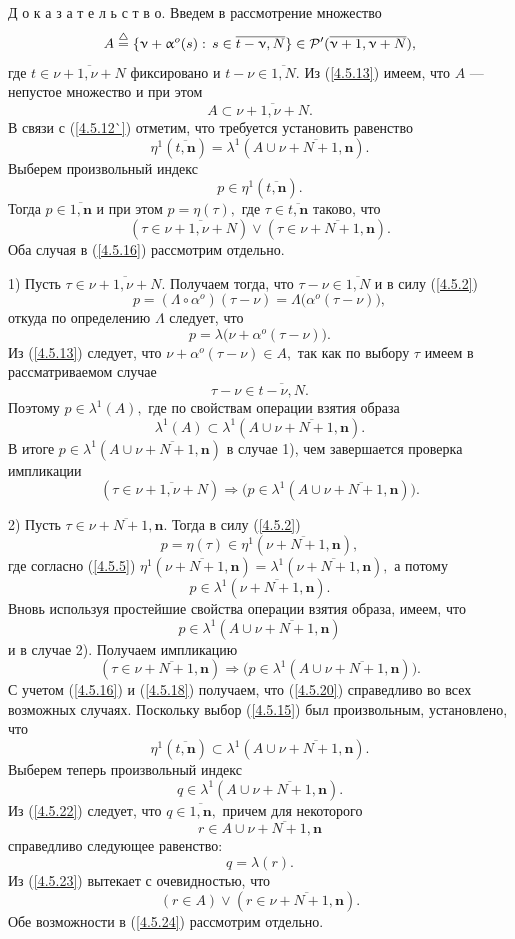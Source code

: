 \documentclass[11pt,twoside,openany]{report}
\newcommand{\bfn}{\begin{equation}}
\newcommand{\efn}{\end{equation}}
\newcommand{\df}{\stackrel{\triangle}{=}}
\newcommand{\ov}{\overline}
\newcommand{\La}{\Lambda}
\newcommand{\la}{\lambda}
\newcommand{\al}{\alpha}
\newcommand{\cp}{{\cal P}}
\begin{document}
{{Д о к а з а т е л ь с т в о. Введем в рассмотрение множество
\bfn\label{4.5.13}
A \df \{\nu +\al^o(s):\,s\in \ov{t-\nu,N}\}\in \cp^\prime(\ov{\nu+1,\nu+N}),
\efn
где $t\in \ov{\nu+1,\nu+N}$ фиксировано и $t-\nu\in \ov{1,N}.$ Из (\ref{4.5.13}) имеем,
что $A$ --- непустое множество и при этом
$$
A \subset \ov{\nu+1,\nu+N}.
$$
В связи с (\ref{4.5.12`}) отметим, что требуется установить равенство
\bfn\label{4.5.14}
\eta^1(\ov{t,\mathbf{n}}) = \la^1(A \cup \ov{\nu+N+1,\mathbf{n}}).
\efn
Выберем произвольный индекс
\bfn\label{4.5.15}
p\in \eta^1(\ov{t,\mathbf{n}}).
\efn
Тогда $p\in \ov{1,\mathbf{n}}$ и при этом $p=\eta(\tau),$ где
$\tau\in \ov{t,\mathbf{n}}$ таково, что
\bfn\label{4.5.16}
(\tau\in \ov{\nu+1,\nu+N}) \vee (\tau\in \ov{\nu+N+1,\mathbf{n}}).
\efn
Оба случая в (\ref{4.5.16}) рассмотрим отдельно.

1) Пусть $\tau\in \ov{\nu+1,\nu+N}.$ Получаем тогда, что $\tau- \nu\in \ov{1,N}$
и в силу (\ref{4.5.2})
$$
p = (\La \circ \al^o)(\tau-\nu) = \La\bigl(\al^o(\tau-\nu)\bigl),
$$
откуда по определению $\La$ следует, что
\bfn\label{4.5.17}
p = \la\bigl(\nu + \al^o(\tau-\nu)\bigl).
\efn
Из (\ref{4.5.13}) следует, что $\nu + \al^o(\tau-\nu) \in A,$ так как по выбору
$\tau$ имеем в рассматриваемом случае
$$
\tau-\nu \in \ov{t-\nu,N}.
$$
Поэтому $p\in \la^1(A),$ где по свойствам операции взятия образа
$$
\la^1(A) \subset \la^1(A \cup \ov{\nu+N+1,\mathbf{n}}).
$$
В итоге $p\in \la^1(A \cup \ov{\nu+N+1,\mathbf{n}})$ в случае 1), чем
завершается проверка импликации
\bfn\label{4.5.18}
(\tau\in \ov{\nu+1,\nu+N}) \Longrightarrow \bigl(p\in \la^1(A \cup
\ov{\nu+N+1,\mathbf{n}})\bigl).
\efn

2) Пусть $\tau \in \ov{\nu+N+1,\mathbf{n}}.$ Тогда в силу (\ref{4.5.2})
$$
p= \eta(\tau) \in \eta^1(\ov{\nu+N+1,\mathbf{n}}),
$$
где согласно (\ref{4.5.5}) $\eta^1(\ov{\nu+N+1,\mathbf{n}}) =
\la^1(\ov{\nu+N+1,\mathbf{n}}),$ а потому
\bfn\label{4.5.19}
p\in \la^1(\ov{\nu+N+1,\mathbf{n}}).
\efn
Вновь используя простейшие свойства  операции взятия образа, имеем, что
\bfn\label{4.5.20}p\in \la^1(A \cup \ov{\nu+N+1,\mathbf{n}})
\efn
и в случае 2). Получаем импликацию
$$
(\tau\in \ov{\nu+N+1,\mathbf{n}})\Longrightarrow \bigl(p\in \la^1(A \cup
\ov{\nu+N+1,\mathbf{n}})\bigl).
$$
С учетом (\ref{4.5.16}) и (\ref{4.5.18}) получаем, что (\ref{4.5.20})
справедливо во всех возможных случаях. Поскольку выбор (\ref{4.5.15}) был
произвольным, установлено, что
\bfn\label{4.5.21}
\eta^1(\ov{t,\mathbf{n}}) \subset \la^1(A \cup \ov{\nu+N+1,\mathbf{n}}).
\efn
Выберем теперь произвольный индекс
\bfn\label{4.5.22}q\in  \la^1(A \cup \ov{\nu+N+1,\mathbf{n}}).
\efn
 Из (\ref{4.5.22}) следует, что $q\in \ov{1,\mathbf{n}},$ причем для некоторого
 \bfn\label{4.5.23}r \in A \cup \ov{\nu+N+1,\mathbf{n}}
 \efn
 справедливо следующее равенство:
 \bfn\label{4.5.23`}q = \la(r).
 \efn
 Из (\ref{4.5.23})  вытекает с очевидностью, что
 \bfn\label{4.5.24}(r\in A) \vee (r\in  \ov{\nu+N+1,\mathbf{n}}).
 \efn
 Обе возможности в (\ref{4.5.24}) рассмотрим отдельно.

}}
\end{document}
